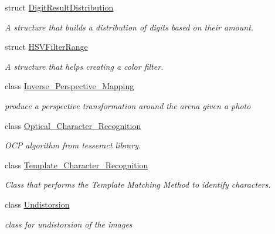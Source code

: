 \begin{DoxyCompactItemize}
struct \mbox{\hyperlink{struct_image_processing_1_1_digit_result_distribution}{Digit\+Result\+Distribution}}
\begin{DoxyCompactList}\small\item\em A structure that builds a distribution of digits based on their amount. \end{DoxyCompactList}\item 
struct \mbox{\hyperlink{struct_image_processing_1_1_h_s_v_filter_range}{H\+S\+V\+Filter\+Range}}
\begin{DoxyCompactList}\small\item\em A structure that helps creating a color filter. \end{DoxyCompactList}\item 
class \mbox{\hyperlink{class_image_processing_1_1_inverse___perspective___mapping}{Inverse\+\_\+\+Perspective\+\_\+\+Mapping}}
\begin{DoxyCompactList}\small\item\em produce a perspective transformation around the arena given a photo \end{DoxyCompactList}\item 
class \mbox{\hyperlink{class_image_processing_1_1_optical___character___recognition}{Optical\+\_\+\+Character\+\_\+\+Recognition}}
\begin{DoxyCompactList}\small\item\em O\+CP algorithm from tesseract library. \end{DoxyCompactList}\item 
class \mbox{\hyperlink{class_image_processing_1_1_template___character___recognition}{Template\+\_\+\+Character\+\_\+\+Recognition}}
\begin{DoxyCompactList}\small\item\em Class that performs the Template Matching Method to identify characters. \end{DoxyCompactList}\item 
class \mbox{\hyperlink{class_image_processing_1_1_undistorsion}{Undistorsion}}
\begin{DoxyCompactList}\small\item\em class for undistorsion of the images \end{DoxyCompactList}\end{DoxyCompactItemize}
